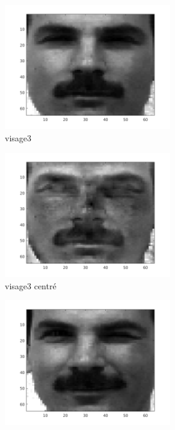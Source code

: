 \documentclass[a4paper]{article}
\begin{document}
\begin{figure}[H]
    \begin{subfigure}[c]{0.24\textwidth}
        \centering
        \includegraphics[width=0.8\textwidth]{images/ex1_x3.png}
        \caption{visage3}
        \label{subfig:ex1_x3}
    \end{subfigure}
    \begin{subfigure}[c]{0.24\textwidth}
        \centering
        \includegraphics[width=0.8\textwidth]{images/ex1_x3c.png}
        \caption{visage3 centré}
        \label{subfig:ex1_x3c}
    \end{subfigure}
    \begin{subfigure}[c]{0.24\textwidth}
        \centering
        \includegraphics[width=0.8\textwidth]{images/ex1_x4.png}

\end{subfigure}
\end{figure}
\end{document}
